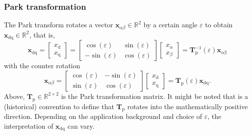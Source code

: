 \begin{frame}
	\frametitle{Park transformation}
    The Park transform rotates a vector $\bm{x}_{\alpha \beta}\in\mathbb{R}^2$ by a certain angle $\varepsilon$ to obtain $\bm{x}_\mathrm{dq}\in\mathbb{R}^2$, that is, 
    \begin{equation}
        \renewcommand{\arraystretch}{1.2}
        \bm{x}_{\mathrm{dq}} = \begin{bmatrix} x_\mathrm{d} \\ x_\mathrm{q} \end{bmatrix} = \begin{bmatrix}
            \cos(\varepsilon) & \sin(\varepsilon)\\
            -\sin(\varepsilon) & \cos(\varepsilon)
        \end{bmatrix} \begin{bmatrix} x_\alpha \\ x_\beta \end{bmatrix} = \bm{T}_\mathrm{p}^{-1}(\varepsilon) \bm{x}_\mathrm{\alpha \beta} 
        \label{eq:Park_transformation}
    \end{equation}
    \pause
    with the counter rotation
    \begin{equation}
        \renewcommand{\arraystretch}{1.2}
        \bm{x}_{\alpha \beta} = \begin{bmatrix}
            \cos(\varepsilon) & -\sin(\varepsilon)\\
            \sin(\varepsilon) & \cos(\varepsilon)
        \end{bmatrix} \begin{bmatrix} x_\mathrm{d} \\ x_\mathrm{q} \end{bmatrix} = \bm{T}_\mathrm{p}(\varepsilon) \bm{x}_{\mathrm{dq}}.
    \end{equation}
    \pause
    Above, $\bm{T}_\mathrm{p}\in\mathbb{R}^{2\times 2}$ is the Park transformation matrix. It might be noted that is a (historical) convention to define that $\bm{T}_\mathrm{p}$ rotates into the mathematically positive direction. Depending on the application background and choice of $\varepsilon$, the interpretation of $\bm{x}_\mathrm{dq}$ can vary.
\end{frame}

